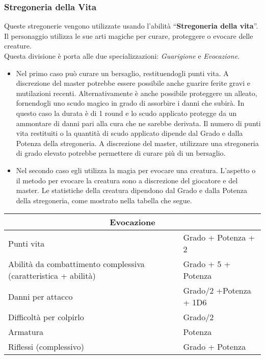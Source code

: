 \documentclass[../manuale_main.tex]{subfiles}
\begin{document}
\subsubsection{Stregoneria della Vita}
Queste stregonerie vengono utilizzate usando l'abilità ``\textbf{Stregoneria della vita}''.\\
Il personaggio utilizza le sue arti magiche per curare, proteggere o evocare delle creature. \\
Questa divisione è porta alle due specializzazioni: \emph{Guarigione} e \emph{Evocazione}.\\
\begin{itemize}
\item Nel primo caso può curare un bersaglio, restituendogli punti vita. A discrezione del master potrebbe essere possibile anche guarire ferite gravi e mutilazioni recenti. Alternativamente è anche possibile proteggere un alleato, fornendogli uno scudo magico in grado di assorbire i danni che subirà. In questo caso la durata è di 1 round e lo scudo applicato protegge da un ammontare di danni pari alla cura che ne sarebbe derivata. Il numero di punti vita restituiti o la quantità di scudo applicato dipende dal Grado e dalla Potenza della stregoneria. A discrezione del master, utilizzare una stregoneria di grado elevato potrebbe permettere di curare più di un bersaglio.
\item Nel secondo caso egli utilizza la magia per evocare una creatura. L'aspetto o il metodo per evocare la creatura sono a discrezione del giocatore e del master. Le statistiche della creatura dipendono dal Grado e dalla Potenza della stregoneria, come mostrato nella tabella che segue.
\end{itemize}

\begin{tabular}{| l | l |}
\hline
\multicolumn{2}{|c|}{\textbf{Evocazione}}\\
\hline
Punti vita&Grado + Potenza + 2\\
Abilità da combattimento complessiva (caratteristica + abilità)&Grado + 5 + Potenza\\
Danni per attacco&Grado/2 +Potenza + 1D6\\
Difficoltà per colpirlo&Grado/2 \\
Armatura&Potenza\\
Riflessi (complessivo)& Grado + Potenza\\
\hline
\end{tabular}\\
\end{document}
